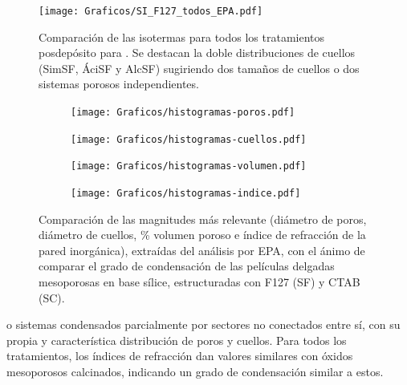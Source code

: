 			\clearpage	   
			\begin{figure}[ht!]
		 	   	   \begin{center}
		 	   	   \texttt{[image: Graficos/SI\_F127\_todos\_EPA.pdf]}
			   	   \caption[Comparación PEA tratamientos alternativos (F127)]{Comparación de las isotermas para todos los tratamientos posdepósito para \pdmF. Se destacan la doble distribuciones de cuellos (SimSF, ÁciSF y AlcSF) sugiriendo dos tamaños de cuellos o dos sistemas porosos independientes.}
				   \label{fig:todos_EPA_F127}	
				   \end{center}
				   \end{figure}	

				   \begin{figure}[ht!]   
				 	   	    \begin{subfigure}[t]{0.5\textwidth}
				        	\texttt{[image: Graficos/histogramas-poros.pdf]}
				       		\end{subfigure}
				         	\begin{subfigure}[t]{0.5\textwidth}
				        	\texttt{[image: Graficos/histogramas-cuellos.pdf]}
				       		\end{subfigure}
				         	 \begin{subfigure}[t]{0.5\textwidth}
				        	\texttt{[image: Graficos/histogramas-volumen.pdf]}
				       		\end{subfigure}
				         	\begin{subfigure}[t]{0.5\textwidth}
				        	\texttt{[image: Graficos/histogramas-indice.pdf]}
				       		\end{subfigure}
				     		\caption[Comparación del grado de condensación de \pdm]{Comparación de las magnitudes más relevante (diámetro de poros, diámetro de cuellos, \% volumen poroso e índice de refracción de la pared inorgánica), extraídas del análisis por EPA, con el ánimo de comparar el grado de condensación de las películas delgadas mesoporosas en base sílice, estructuradas con F127 (SF) y CTAB (SC).}
				     		\label{fig:histogramas}
				     		\end{figure}
        \noindent o sistemas condensados parcialmente por sectores no conectados entre sí, con su propia y característica distribución de poros y cuellos. Para todos los tratamientos, los índices de refracción dan valores similares con óxidos mesoporosos calcinados, indicando un grado de condensación similar a estos. 			

